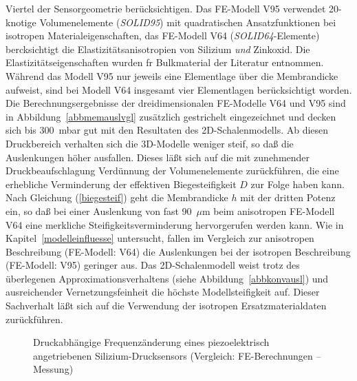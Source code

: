 Viertel der Sensorgeometrie berücksichtigen.
Das FE-Modell V95 verwendet 20-knotige
Volumenelemente ({\em SOLID95}) mit quadratischen Ansatzfunktionen bei
isotropen Materialeigenschaften, das FE-Modell V64 ({\em SOLID64}-Elemente)
bercksichtigt die Elastizitätsanisotropien von Silizium {\em und} Zinkoxid.
Die Elastizitätseigenschaften wurden
fr Bulkmaterial der Literatur \cite{LB82} entnommen. Während das Modell V95
nur jeweils eine Elementlage über die Membrandicke aufweist, sind bei
Modell V64 insgesamt vier Elementlagen berücksichtigt worden.
Die Berechnungsergebnisse der dreidimensionalen FE-Modelle V64 und V95 sind
in Abbildung~\ref{abbmemauslvgl} zusätzlich gestrichelt eingezeichnet
und decken sich bis 300~mbar gut mit den Resultaten des 2D-Schalenmodells.
Ab diesen Druckbereich verhalten sich die 3D-Modelle weniger steif, so daß
die Auslenkungen höher ausfallen. Dieses läßt sich auf die mit zunehmender
Druckbeaufschlagung Verdünnung der Volumenelemente zurückführen, die eine
erhebliche Verminderung der effektiven Biegesteifigkeit $D$
zur Folge haben kann. Nach
Gleichung (\ref{biegesteif}) geht die Membrandicke $h$ mit der dritten
Potenz ein, so daß bei einer Auslenkung von fast 90~$\mu$m beim
anisotropen FE-Modell V64 eine merkliche Steifigkeitsverminderung
hervorgerufen werden kann.
Wie in Kapitel~\ref{modelleinfluesse} untersucht, fallen im Vergleich zur
anisotropen Beschreibung (FE-Modell: V64) die Auslenkungen bei der
isotropen Beschreibung (FE-Modell: V95) geringer aus. Das 2D-Schalenmodell
weist trotz des überlegenen Approximationsverhaltens (siehe
Abbildung~\ref{abbkonvausl}) und ausreichender Vernetzungsfeinheit
die höchste Modellsteifigkeit auf. Dieser Sachverhalt läßt sich auf die
Verwendung der isotropen Ersatzmaterialdaten zurückführen.\\
\begin{figure}[htb]
 \begin{center}

\setabbvn
\end{center}
\caption{\label{abbmemfreqvgl}
 Druckabhängige Frequenzänderung eines piezoelektrisch angetriebenen
 Silizium-Drucksensors (Vergleich: FE-Berechnungen -- Messung)}
\end{figure}
